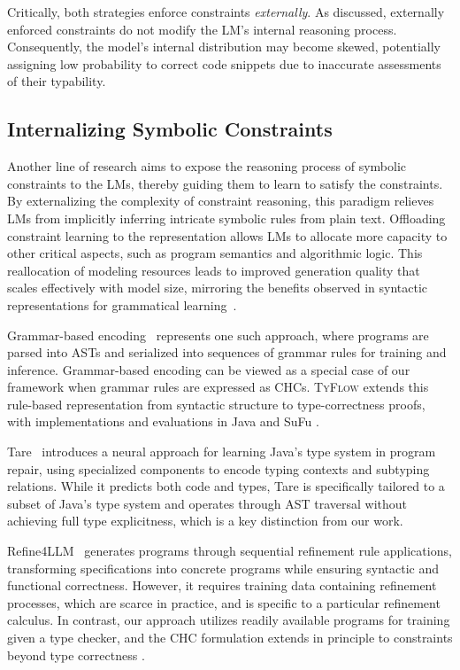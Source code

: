 \documentclass[manuscript,screen]{acmart}
\newcommand{\toolname}[1]{\textsc{#1}}
\newcommand{\mainname}{\toolname{TyFlow}\xspace}
\begin{document}
Critically, both strategies enforce constraints \emph{externally}. As discussed, externally enforced constraints do not modify the LM's internal reasoning process. Consequently, the model's internal distribution may become skewed, potentially assigning low probability to correct code snippets due to inaccurate assessments of their typability.

\subsection{Internalizing Symbolic Constraints}
Another line of research aims to expose the reasoning process of symbolic constraints to the LMs, thereby guiding them to learn to satisfy the constraints.
%
By externalizing the complexity of constraint reasoning, this paradigm relieves LMs from implicitly inferring intricate symbolic rules from plain text. Offloading constraint learning to the representation allows LMs to allocate more capacity to other critical aspects, such as program semantics and algorithmic logic. This reallocation of modeling resources leads to improved generation quality that scales effectively with model size, mirroring the benefits observed in syntactic representations for grammatical learning~\cite{DBLP:conf/acl/LiangZ0LLXCZZZC25}.

Grammar-based encoding~\cite{DBLP:conf/acl/YinN17,DBLP:conf/aaai/SunZXSMZ20,DBLP:conf/icse/ZhuL000C24} represents one such approach, where programs are parsed into ASTs and serialized into sequences of grammar rules for training and inference. 
Grammar-based encoding can be viewed as a special case of our framework when grammar rules are expressed as CHCs.    \mainname{} {\color{revblue}extends this rule-based representation from syntactic structure to type-correctness proofs, with implementations and evaluations in Java and SuFu} .

Tare~\cite{DBLP:conf/icse/ZhuSZXZ23} introduces a neural approach for learning Java's type system in program repair, using specialized components to encode typing contexts and subtyping relations. While it predicts both code and types, Tare is specifically tailored to a subset of Java's type system and operates through AST traversal without achieving full type explicitness, which is a key distinction from our work.

Refine4LLM~\cite{DBLP:journals/pacmpl/CaiHSLLSD25} generates programs through sequential refinement rule applications, transforming specifications into concrete programs while ensuring syntactic and functional correctness. However, it requires training data containing refinement processes, which are scarce in practice, and is specific to a particular refinement calculus. In contrast, our approach utilizes readily available programs for training given a type checker, and    {\color{revblue}the CHC formulation extends in principle to constraints beyond type correctness} .
\end{document}
